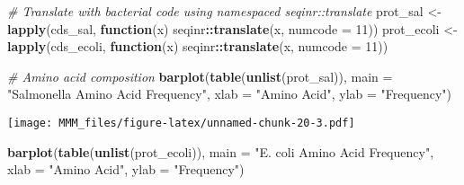 \documentclass[
]{article}
\newenvironment{Shaded}{\begin{snugshade}}{\end{snugshade}}
\newcommand{\AttributeTok}[1]{\textcolor[rgb]{0.13,0.29,0.53}{#1}}
\newcommand{\CommentTok}[1]{\textcolor[rgb]{0.56,0.35,0.01}{\textit{#1}}}
\newcommand{\ControlFlowTok}[1]{\textcolor[rgb]{0.13,0.29,0.53}{\textbf{#1}}}
\newcommand{\DecValTok}[1]{\textcolor[rgb]{0.00,0.00,0.81}{#1}}
\newcommand{\FunctionTok}[1]{\textcolor[rgb]{0.13,0.29,0.53}{\textbf{#1}}}
\newcommand{\NormalTok}[1]{#1}
\newcommand{\OtherTok}[1]{\textcolor[rgb]{0.56,0.35,0.01}{#1}}
\newcommand{\SpecialCharTok}[1]{\textcolor[rgb]{0.81,0.36,0.00}{\textbf{#1}}}
\newcommand{\StringTok}[1]{\textcolor[rgb]{0.31,0.60,0.02}{#1}}
\begin{document}
\begin{Shaded}
\begin{Highlighting}[]
\CommentTok{\# Translate with bacterial code using namespaced seqinr::translate}
\NormalTok{prot\_sal   }\OtherTok{\textless{}{-}} \FunctionTok{lapply}\NormalTok{(cds\_sal,   }\ControlFlowTok{function}\NormalTok{(x) seqinr}\SpecialCharTok{::}\FunctionTok{translate}\NormalTok{(x, }\AttributeTok{numcode =} \DecValTok{11}\NormalTok{))}
\NormalTok{prot\_ecoli }\OtherTok{\textless{}{-}} \FunctionTok{lapply}\NormalTok{(cds\_ecoli, }\ControlFlowTok{function}\NormalTok{(x) seqinr}\SpecialCharTok{::}\FunctionTok{translate}\NormalTok{(x, }\AttributeTok{numcode =} \DecValTok{11}\NormalTok{))}

\CommentTok{\# Amino acid composition}
\FunctionTok{barplot}\NormalTok{(}\FunctionTok{table}\NormalTok{(}\FunctionTok{unlist}\NormalTok{(prot\_sal)),}
        \AttributeTok{main =} \StringTok{"Salmonella Amino Acid Frequency"}\NormalTok{,}
        \AttributeTok{xlab =} \StringTok{"Amino Acid"}\NormalTok{, }\AttributeTok{ylab =} \StringTok{"Frequency"}\NormalTok{)}
\end{Highlighting}
\end{Shaded}

\texttt{[image: MMM\_files/figure-latex/unnamed-chunk-20-3.pdf]}

\begin{Shaded}
\begin{Highlighting}[]
\FunctionTok{barplot}\NormalTok{(}\FunctionTok{table}\NormalTok{(}\FunctionTok{unlist}\NormalTok{(prot\_ecoli)),}
        \AttributeTok{main =} \StringTok{"E. coli Amino Acid Frequency"}\NormalTok{,}
        \AttributeTok{xlab =} \StringTok{"Amino Acid"}\NormalTok{, }\AttributeTok{ylab =} \StringTok{"Frequency"}\NormalTok{)}
\end{Highlighting}
\end{Shaded}
\end{document}
